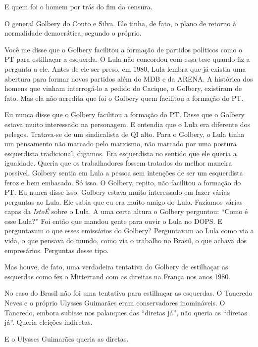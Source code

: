  E quem foi o homem por trás do fim da censura.

 O general Golbery do Couto e Silva. Ele tinha, de fato, o plano de
retorno à normalidade democrática, segundo o próprio.

 Você me disse que o Golbery facilitou a formação de partidos
políticos como o PT para estilhaçar a esquerda. O Lula não concordou com
essa tese quando fiz a pergunta a ele. Antes de ele ser preso, em 1980,
Lula lembra que já existia uma abertura para formar novos partidos além
do MDB e da ARENA. A histórica dos homens que vinham interrogá-lo a
pedido do Cacique, o Golbery, existiram de fato. Mas ela não acredita
que foi o Golbery quem facilitou a formação do PT.

 Eu nunca disse que o Golbery facilitou a formação do PT. Disse que o
Golbery estava muito interessado na personagem. E entendia que o Lula
era diferente dos pelegos. Tratava-se de um sindicalista de QI alto.
Para o Golbery, o Lula tinha um pensamento não marcado pelo marxismo,
não marcado por uma postura esquerdista tradicional, digamos. Era
esquerdista no sentido que ele queria a igualdade. Queria que os
trabalhadores fossem tratados da melhor maneira possível. Golbery sentia
em Lula a pessoa sem intenções de ser um esquerdista feroz e bem
embasado. Só isso. O Golbery, repito, não facilitou a formação do PT. Eu
nunca disse isso. Golbery estava muito interessado em fazer várias
perguntas ao Lula. Ele sabia que eu era muito amigo do Lula. Fazíamos
várias capas da \emph{IstoÉ} sobre o Lula. A uma certa altura o Golbery
perguntou: ``Como é esse Lula?'' Foi então que mandou gente para ouvir o
Lula no DOPS. E perguntavam o que esses emissários do Golbery?
Perguntavam ao Lula como via a vida, o que pensava do mundo, como via o
trabalho no Brasil, o que achava dos empresários. Perguntas desse tipo.

 Mas houve, de fato, uma verdadeira tentativa do Golbery de estilhaçar
as esquerdas como fez o Mitterrand com as direitas na França nos anos
1980.

 No caso do Brasil não foi uma tentativa para estilhaçar as esquerdas.
O Tancredo Neves e o próprio Ulysses Guimarães eram conservadores
inomináveis. O Tancredo, embora subisse nos palanques das ``diretas
já'', não queria as ``diretas já''. Queria eleições indiretas.

 E o Ulysses Guimarães queria as diretas.

